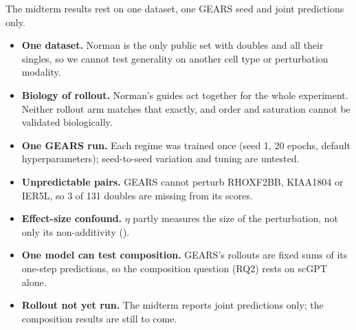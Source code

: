 The midterm results rest on one dataset, one GEARS seed and joint predictions only.
\begin{itemize}[nosep]
  \item \textbf{One dataset.} Norman is the only public set with doubles and all their
  singles, so we cannot test generality on another cell type or perturbation modality.
  \item \textbf{Biology of rollout.} Norman's guides act together for the whole experiment.
  Neither rollout arm matches that exactly, and order and saturation cannot be validated
  biologically.
  \item \textbf{One GEARS run.} Each regime was trained once (seed 1, 20 epochs, default
  hyperparameters); seed-to-seed variation and tuning are untested.
  \item \textbf{Unpredictable pairs.} GEARS cannot perturb RHOXF2BB, KIAA1804 or IER5L, so 3
  of 131 doubles are missing from its scores.
  \item \textbf{Effect-size confound.} $\eta$ partly measures the size of the perturbation,
  not only its non-additivity ().
  \item \textbf{One model can test composition.} GEARS's rollouts are fixed sums of
  its one-step predictions, so the composition question (RQ2) rests on scGPT alone.
  \item \textbf{Rollout not yet run.} The midterm reports joint predictions only; the
  composition results are still to come.
\end{itemize}

